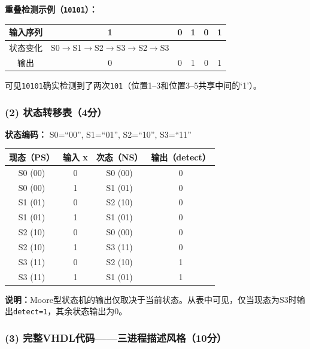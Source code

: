 \noindent\textbf{重叠检测示例（\texttt{10101}）：}
\begin{center}
\begin{tabular}{c|ccccc}
输入序列 & 1 & 0 & 1 & 0 & 1 \\
\hline
状态变化 & S0$\rightarrow$S1$\rightarrow$S2$\rightarrow$S3$\rightarrow$S2$\rightarrow$S3 \\
输出 & 0 & 0 & 1 & 0 & 1 \\
\end{tabular}
\end{center}
可见\texttt{10101}确实检测到了两次\texttt{101}（位置1--3和位置3--5共享中间的`1'）。

\subsubsection*{(2) 状态转移表（4分）}

\begin{center}
\textbf{状态编码：} S0=``00'', S1=``01'', S2=``10'', S3=``11''

\vspace{0.3cm}
\begin{tabular}{|c|c|c|c|}
\hline
\textbf{现态（PS）} & \textbf{输入 x} & \textbf{次态（NS）} & \textbf{输出（detect）} \\
\hline
S0 (00) & 0 & S0 (00) & 0 \\
S0 (00) & 1 & S1 (01) & 0 \\
\hline
S1 (01) & 0 & S2 (10) & 0 \\
S1 (01) & 1 & S1 (01) & 0 \\
\hline
S2 (10) & 0 & S0 (00) & 0 \\
S2 (10) & 1 & S3 (11) & 0 \\
\hline
S3 (11) & 0 & S2 (10) & 1 \\
S3 (11) & 1 & S1 (01) & 1 \\
\hline
\end{tabular}
\end{center}

\noindent\textbf{说明：}Moore型状态机的输出仅取决于当前状态。从表中可见，仅当现态为S3时输出\texttt{detect=1}，其余状态输出为0。

\subsubsection*{(3) 完整VHDL代码——三进程描述风格（10分）}


